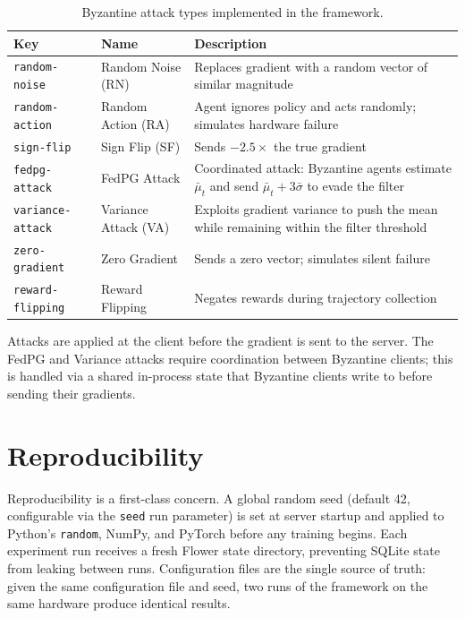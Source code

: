 \documentclass[a4paper, oneside]{discothesis}
\begin{document}
\begin{table}[h]
\centering
\caption{Byzantine attack types implemented in the framework.}
\label{tab:attacks}
{\renewcommand{\arraystretch}{1.6}
\begin{tabular}{llp{7cm}}
\hline
\textbf{Key} & \textbf{Name} & \textbf{Description} \\
\hline
\texttt{random-noise}    & Random Noise (RN)   & Replaces gradient with a random vector of similar magnitude \\
\texttt{random-action}   & Random Action (RA)  & Agent ignores policy and acts randomly; simulates hardware failure \\
\texttt{sign-flip}       & Sign Flip (SF)      & Sends $-2.5 \times$ the true gradient \\
\texttt{fedpg-attack}    & FedPG Attack        & Coordinated attack: Byzantine agents estimate $\bar{\mu}_t$ and send $\bar{\mu}_t + 3\bar{\sigma}$ to evade the filter \\
\texttt{variance-attack} & Variance Attack (VA) & Exploits gradient variance to push the mean while remaining within the filter threshold \\
\texttt{zero-gradient}   & Zero Gradient       & Sends a zero vector; simulates silent failure \\
\texttt{reward-flipping} & Reward Flipping     & Negates rewards during trajectory collection \\
\hline
\end{tabular}}
\end{table}

Attacks are applied at the client before the gradient is sent to the server. The FedPG and Variance attacks require coordination between Byzantine clients; this is handled via a shared in-process state that Byzantine clients write to before sending their gradients.

\section{Reproducibility}
\label{sec:bench:repro}

Reproducibility is a first-class concern. A global random seed (default 42, configurable via the \texttt{seed} run parameter) is set at server startup and applied to Python's \texttt{random}, NumPy, and PyTorch before any training begins. Each experiment run receives a fresh Flower state directory, preventing SQLite state from leaking between runs. Configuration files are the single source of truth: given the same configuration file and seed, two runs of the framework on the same hardware produce identical results.
\end{document}
